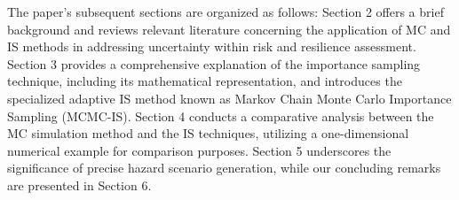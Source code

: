     The paper's subsequent sections are organized as follows: Section 2 offers a brief background and reviews relevant literature concerning the application of MC and IS methods in addressing uncertainty within risk and resilience assessment. Section 3 provides a comprehensive explanation of the importance sampling technique, including its mathematical representation, and introduces the specialized adaptive IS method known as Markov Chain Monte Carlo Importance Sampling (MCMC-IS). Section 4 conducts a comparative analysis between the MC simulation method and the IS techniques, utilizing a one-dimensional numerical example for comparison purposes. Section 5 underscores the significance of precise hazard scenario generation, while our concluding remarks are presented in Section 6.